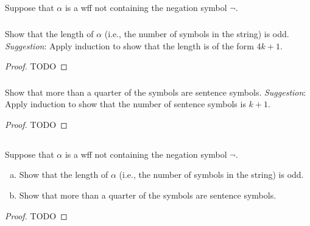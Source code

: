 \documentclass{report}
\begin{document}
\subsection{}%

  Suppose that $\alpha$ is a wff not containing the negation symbol $\neg$.

\subsubsection{}%

  Show that the length of $\alpha$ (i.e., the number of symbols in the string)
    is odd.
  \textit{Suggestion}: Apply induction to show that the length is of the form
    $4k + 1$.

  \begin{proof}
    TODO
  \end{proof}

\subsubsection{}%

  Show that more than a quarter of the symbols are sentence symbols.
  \textit{Suggestion}: Apply induction to show that the number of sentence
    symbols is $k + 1$.

  \begin{proof}
    TODO
  \end{proof}

\subsection{}%

  Suppose that $\alpha$ is a wff not containing the negation symbol $\neg$.
  \begin{enumerate}[(a)]
    \item Show that the length of $\alpha$ (i.e., the number of symbols in the
      string) is odd.
    \item Show that more than a quarter of the symbols are sentence symbols.
  \end{enumerate}

  \begin{proof}
    TODO
  \end{proof}
\end{document}
